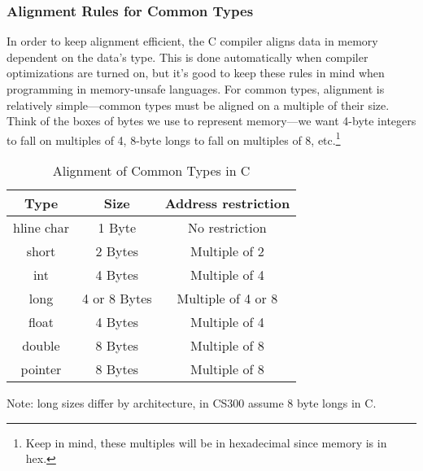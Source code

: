 \documentclass[a4paper, 12pt]{article}
\begin{document}
\newpage

\subsubsection{Alignment Rules for Common Types}
\begin{flushleft}
	In order to keep alignment efficient, the C compiler aligns data in memory dependent on the data's type.
	This is done automatically when compiler optimizations are turned on, but it's good to keep these rules in mind
	when programming in memory-unsafe languages.
	\newline\newline
	For common types, alignment is relatively simple---common types must be aligned on a multiple of their size.
	Think of the boxes of bytes we use to represent memory---we want 4-byte integers to fall on multiples of 4,
	8-byte longs to fall on multiples of 8, etc.\footnote{Keep in mind, these multiples will be in hexadecimal since memory is in hex.}

\end{flushleft}

\begin{table}
	\centering
	\begin{threeparttable}
		\label{tab:alignmentcom}
		\caption{Alignment of Common Types in C}
		\begin{tabular}{||c c c||}
			\hline
			Type    & Size         & Address restriction \\ [0.5ex]
			\hline
			hline
			char    & 1 Byte       & No restriction      \\ [1ex] 
			short   & 2 Bytes      & Multiple of 2       \\ [1ex]
			int     & 4 Bytes      & Multiple of 4       \\ [1ex]
			long    & 4 or 8 Bytes & Multiple of 4 or 8  \\ [1ex]
			float   & 4 Bytes      & Multiple of 4       \\ [1ex]
			double  & 8 Bytes      & Multiple of 8       \\ [1ex]
			pointer & 8 Bytes      & Multiple of 8       \\ [1ex]
			\hline
		\end{tabular}
		\begin{tablenotes}
			\small
			\item Note: long sizes differ by architecture, in CS300 assume 8 byte longs in C.
		\end{tablenotes}
	\end{threeparttable}
\end{table}
\FloatBarrier
\end{document}
